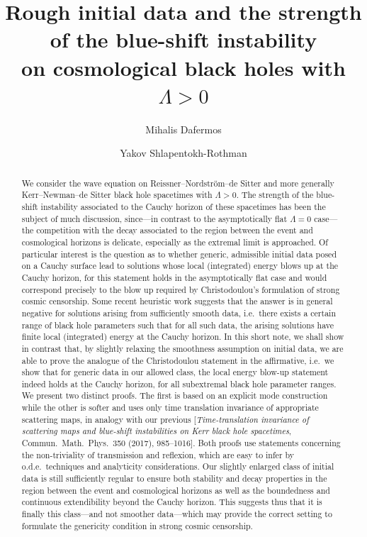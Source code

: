 \documentclass[A4,10pt]{article}
\title{Rough initial data and the strength of the blue-shift instability\\ on cosmological black holes with
$\Lambda>0$}
\author[1,2]{Mihalis Dafermos}
\author[2]{Yakov Shlapentokh-Rothman}
\affil[1]{\small University of Cambridge, Department of Pure Mathematics and Mathematical
Statistics, Wilberforce~Road,~Cambridge~CB3~0WA,~United~Kingdom\vskip.2pc \ }
\affil[2]{\small Princeton University, Department of Mathematics, Fine~Hall,~Washington~Road,~Princeton,~NJ~08544,~United~States~of~America\vskip.2pc \ }
\begin{document}
\maketitle

\begin{abstract}
We consider the wave equation on  Reissner--Nordstr\"om--de Sitter
and more generally Kerr--Newman--de Sitter black hole spacetimes with $\Lambda>0$. 
The strength of the blue-shift instability associated to the Cauchy horizon of
these spacetimes has been the subject of much discussion, since---in contrast 
to the asymptotically flat $\Lambda=0$ case---the
competition with the  decay  associated to the region
between the event and cosmological horizons is  delicate, especially as
the extremal limit is approached.
Of particular interest is the question
as to whether generic, admissible initial data posed on a Cauchy surface 
lead to solutions whose local (integrated) energy blows up at the Cauchy horizon, for this 
statement holds in the asymptotically
flat case and would correspond precisely 
to the blow up required by Christodoulou's formulation of strong cosmic censorship. 
Some recent heuristic work suggests that the answer is in general negative for solutions
arising from sufficiently
smooth
data, i.e.~there exists
a certain range of black hole parameters such that 
for  all such data,
the arising solutions have finite
local (integrated) energy at the Cauchy horizon.
In this short note, we shall show in contrast that, by slightly relaxing the smoothness
assumption on initial data, we are able to prove the analogue of the Christodoulou
statement in the affirmative,
 i.e.~we show that for generic  data in our allowed class,
 the local energy blow-up statement indeed holds at the Cauchy horizon,
for all subextremal black hole parameter ranges. 
We present two distinct proofs. The first is based on an explicit
mode construction while the other  is softer and uses only time translation invariance
of appropriate scattering maps, in analogy with our previous
[\emph{Time-translation invariance of scattering maps and blue-shift instabilities on Kerr black hole spacetimes},
 Commun.~Math.~Phys.~350 (2017), 985--1016].
 Both proofs use statements concerning the non-triviality of transmission and
reflexion, which are easy to infer by o.d.e.~techniques and analyticity considerations.
  Our slightly enlarged class of initial data is 
 still sufficiently regular to ensure both stability and decay properties in the
region between the event and cosmological horizons as well as
the boundedness and 
continuous extendibility beyond the Cauchy horizon. This suggests thus that it is finally this 
class---and not smoother data---which may provide the  correct setting to formulate 
the genericity condition in  strong cosmic censorship.
\end{abstract}
\end{document}
